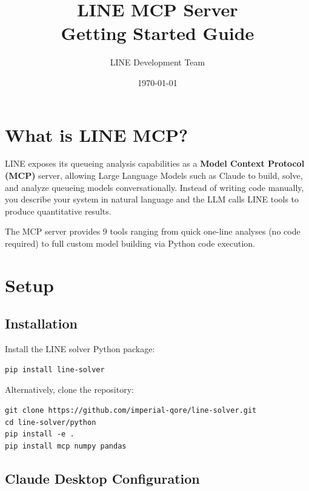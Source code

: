 \documentclass[11pt]{article}
\title{\vspace{-1cm}\textbf{LINE MCP Server}\\[6pt]\Large Getting Started Guide}
\author{LINE Development Team}
\date{\today}
\begin{document}
\maketitle
\thispagestyle{fancy}

\section{What is LINE MCP?}

LINE exposes its queueing analysis capabilities as a \textbf{Model Context Protocol (MCP)} server, allowing Large Language Models such as Claude to build, solve, and analyze queueing models conversationally. Instead of writing code manually, you describe your system in natural language and the LLM calls LINE tools to produce quantitative results.

The MCP server provides 9 tools ranging from quick one-line analyses (no code required) to full custom model building via Python code execution.

\section{Setup}

\subsection{Installation}

Install the LINE solver Python package:

\begin{lstlisting}[style=shellstyle]
pip install line-solver
\end{lstlisting}

Alternatively, clone the repository:

\begin{lstlisting}[style=shellstyle]
git clone https://github.com/imperial-qore/line-solver.git
cd line-solver/python
pip install -e .
pip install mcp numpy pandas
\end{lstlisting}

\subsection{Claude Desktop Configuration}
\end{document}
